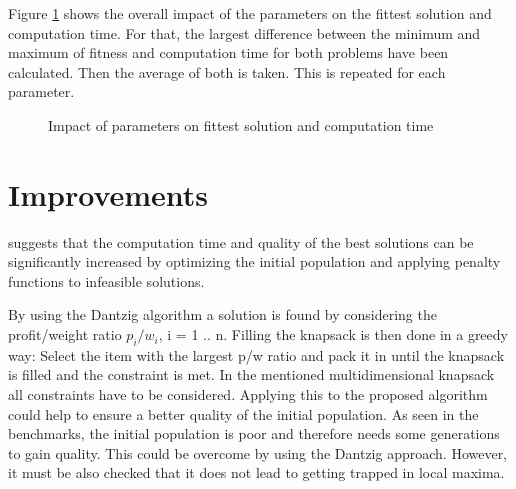 \documentclass[a4paper]{article}
\begin{document}
Figure \ref{fig:impact} shows the overall impact of the parameters on the fittest solution and computation time. For that, the largest difference between the minimum and maximum of fitness and computation time for both problems have been calculated. Then the average of both is taken. This is repeated for each parameter.

\begin{figure}
\hfill
{}
\caption{Impact of parameters on fittest solution and computation time}
\label{fig:impact}
\end{figure}


\section{Improvements}

\cite{bib:dj} suggests that the computation time and quality of the best solutions can be significantly increased by optimizing the initial population and applying penalty functions to infeasible solutions. 

By using the Dantzig algorithm a solution is found by considering the profit/weight ratio \(p_{i}/w{_i}\), i = 1 .. n.  Filling the knapsack is then done in a greedy way: Select the item with the largest p/w ratio and pack it in until the knapsack is filled and the constraint is met. In the mentioned multidimensional knapsack all constraints have to be considered. Applying this to the proposed algorithm could help to ensure a better quality of the initial population. As seen in the benchmarks, the initial population is poor and therefore needs some generations to gain quality. This could be overcome by using the Dantzig approach. However, it must be also checked that it does not lead to getting trapped in local maxima.
\end{document}

